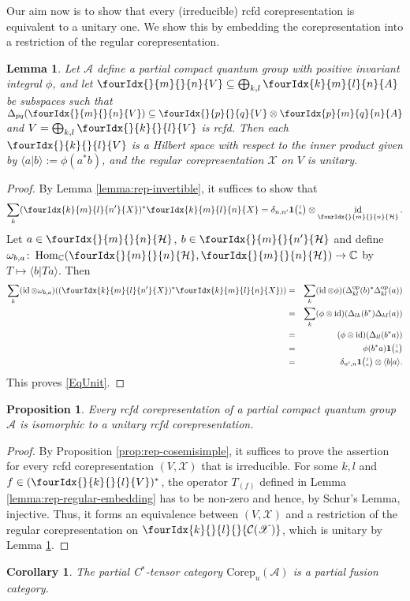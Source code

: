 \documentclass[11pt]{article}
\DeclareMathOperator{\id}{id}
\DeclareMathOperator{\Hom}{Hom}
\DeclareMathOperator{\op}{\mathrm{op}}
\newcommand{\dual}[1]{#1^{*}}
\newcommand{\Corep}{\mathrm{Corep}}
\newcommand{\C}{\mathbb{C}}
\newcommand{\Hsp}{\mathcal{H}}
\newcommand{\Grt}[3]{#1{\tiny {\begin{pmatrix} #2\\#3\end{pmatrix}}}}
\newcommand{\UnitC}[2]{\Grt{\mathbf{1}}{#1}{#2}}
\newcommand{\Gr}[5]{\fourIdx{#2}{#4}{#3}{#5}{#1}}%
\newcommand{\Gru}[3]{\Gr{#1}{}{}{#2}{#3}}
\newcommand{\Grd}[3]{\Gr{#1}{#2}{#3}{}{}}
\newtheorem{Lem}[Theorem]{Lemma}
\newtheorem{Prop}[Theorem]{Proposition}
\newtheorem{Cor}[Theorem]{Corollary}
\theoremstyle{definition}
\numberwithin{equation}{section}
\begin{document}
Our aim now is to show that every (irreducible) rcfd corepresentation is
equivalent to a unitary one. We show this by embedding the
corepresentation into a restriction of the regular corepresentation.
\begin{Lem} \label{lemma:rep-regular-unitary}
  Let $\mathscr{A}$ define a partial compact quantum group with
positive invariant  integral $\phi$, and let $\Gru{V}{m}{n} \subseteq
\bigoplus_{k,l} \Gr{A}{k}{l}{m}{n}$ be subspaces such that
$\Delta_{pq}(\Gru{V}{m}{n}) \subseteq \Gru{V}{p}{q} \otimes
    \Gr{A}{p}{q}{m}{n}$ and $V=\bigoplus_{k,l} \Gru{V}{k}{l}$ is rcfd. Then each $\Gru{V}{k}{l}$ is a Hilbert space with
    respect to the inner product given by $\langle
    a|b\rangle:=\phi(a^{*}b)$, and the regular corepresentation
    $\mathscr{X}$ on $V$ is unitary.
\end{Lem}
\begin{proof} 
By Lemma \ref{lemma:rep-invertible},  it suffices to show that
  \begin{equation}\label{EqUnit} \sum_{k}
    (\Gr{X}{k}{l}{m}{n'})^* \Gr{X}{k}{l}{m}{n} =
    \delta_{n,n'}\UnitC{l}{n}\otimes
    \id_{\Gru{\Hsp}{m}{n}}.
  \end{equation} 
Let  $a\in \Gru{\Hsp}{m}{n}$, $b\in \Gru{\Hsp}{m}{n'}$ and define $\omega_{b,a} \colon
\Hom_{\C}(\Gru{\Hsp}{m}{n},\Gru{\Hsp}{m}{n}) \to \C$ by $T
\mapsto \langle b|Ta\rangle$. Then
\begin{eqnarray*}
\sum_{k }(\id \otimes \omega_{b,a})
((\Gr{X}{k}{l}{m}{n'})^* \Gr{X}{k}{l}{m}{n}))  &=& \sum_k
(\id\otimes \phi)(\Delta_{kl}^{\op}(b)^*\Delta_{kl}^{\op}(a))\\
  &=& \sum_k (\phi\otimes
  \id)(\Delta_{lk}(b^*)\Delta_{kl}(a)) \\ &=& (\phi\otimes
  \id)(\Delta_{ll}(b^*a)) \\ &=& \phi(b^*a)\UnitC{l}{n} \\&=&
  \delta_{n',n} \UnitC{l}{n} \otimes \langle b|a\rangle.
\end{eqnarray*} 
This proves \eqref{EqUnit}.
\end{proof} 

\begin{Prop} \label{prop:rep-unitarisable} Every  rcfd
  corepresentation of a partial compact quantum group $\mathscr{A}$ is
  isomorphic to a unitary rcfd corepresentation.
\end{Prop}
\begin{proof}
  By Proposition \ref{prop:rep-cosemisimple}, it suffices to prove the
  assertion for every rcfd corepresentation $(V,\mathscr{X})$ that is
  irreducible.  For some $k,l$ and $f \in
  \dual{(\Gru{V}{k}{l})}$, the operator $T_{(f)}$ defined in
  Lemma \ref{lemma:rep-regular-embedding} has to be non-zero and
  hence, by Schur's Lemma, injective. Thus, it forms an equivalence
  between $(V,\mathscr{X})$ and a restriction of the regular
  corepresentation on $\Grd{\mathcal{C}(\mathscr{X})}{k}{l}$, which is
  unitary by Lemma \ref{lemma:rep-regular-unitary}.
\end{proof}
\begin{Cor} The partial C$^*$-tensor category $\Corep_u(\mathscr{A})$ is a partial fusion category.
\end{Cor}
\end{document}
